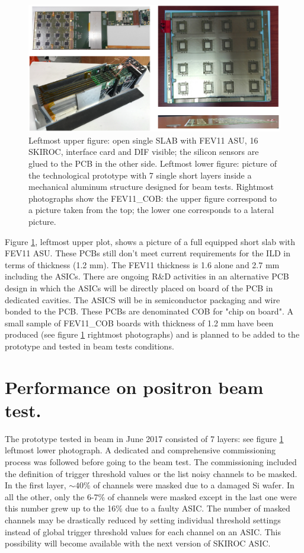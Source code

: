 \documentclass[a4paper,11pt]{article}
\begin{document}
\begin{figure}[!t]
  \centering
  \includegraphics[width=5in]{figures/techno_fev8.eps}
  \caption{Leftmost upper figure: open single SLAB with FEV11 ASU, 16 SKIROC, interface card and DIF visible; the silicon sensors are glued to the PCB in the other side. Leftmost lower figure: picture of the technological prototype with 7 single short layers inside a mechanical aluminum structure designed for beam tests. Rightmost photographs show the FEV11\_COB: the upper figure correspond to a picture taken from the top; the lower one corresponds to a lateral picture.}
  \label{proto}
\end{figure}


Figure \ref{proto}, leftmost upper plot, shows a picture of a full equipped short slab with FEV11 ASU. 
These PCBs still don't meet current requirements
for the ILD in terms of thickness (1.2 mm). The FEV11 thickness is 1.6 alone and 2.7 mm including the ASICs.
There are ongoing R\&D activities in an alternative PCB design in which the ASICs
will be directly placed on board of the PCB in dedicated cavities. The ASICS will be in semiconductor packaging and wire bonded to the PCB.
These PCBs are denominated COB for "chip on board".
A small sample of FEV11\_COB boards with thickness of 1.2 mm have been produced (see figure \ref{proto} rightmost photographs)
and is planned to be added to the prototype and tested in beam tests conditions.



\section{Performance on positron beam test.}

The prototype tested in beam in June 2017 consisted of 7 layers: see figure \ref{proto} leftmost lower photograph.
A dedicated and comprehensive commissioning process was followed before going to the beam test.
The commissioning included the definition of trigger threshold values or the list noisy channels to be masked.
In the first layer, $\sim 40\%$ of channels were masked due to a damaged Si wafer. In all the other, only the 6-7\% of channels were masked except in the last one were this number grew up to the 16\% due to a faulty ASIC. The number of masked channels may be drastically reduced by setting individual threshold settings instead of global trigger threshold values for each channel on an ASIC. This possibility will become available with the next version of SKIROC ASIC.
\end{document}
